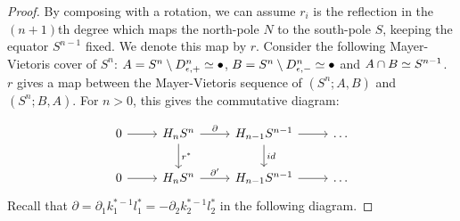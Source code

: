 \begin{proof}
By composing with a rotation, we can assume $r_i$ is the reflection in the $(n+1)$th degree which maps the north-pole $N$ to the south-pole $S$, keeping the equator $S^{n-1}$ fixed. We denote this map by $r$. Consider the following Mayer-Vietoris cover of $S^n$:  $A=S^n\setminus D^n_{\epsilon,+}\simeq \bullet$, $B=S^n\setminus D^n_{\epsilon,-}\simeq \bullet$ and $A\cap B \simeq S^{n-1}$. $r$ gives a map between the Mayer-Vietoris sequence of $(S^n;A,B)$ and $(S^n;B,A)$. For $n>0$, this gives the commutative diagram:

\[\begin{tikzcd}
0 \arrow[r] & H_nS^n \arrow[d, "r^*"] \arrow[r, "\partial"] & H_{n-1}S^{n-1} \arrow[d, "id"] \arrow[r] & \dots \\
0 \arrow[r] & H_nS^n \arrow[r, "\partial'"]                 & H_{n-1}S^{n-1} \arrow[r]                 & \dots
\end{tikzcd}\]
Recall that $\partial=\partial_1k_1^{*-1}l_1^*=-\partial_2k_2^{*-1}l_2^*$ in the following diagram.


\end{proof}
